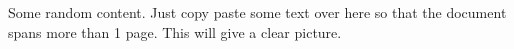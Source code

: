 \documentclass{article}
\begin{document}
	Some random content. Just copy paste some text over here so that the document spans more than 1 page. This will give a clear picture.
\end{document}
